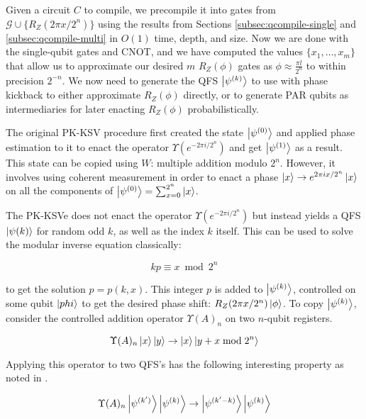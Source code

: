 Given a circuit $C$ to compile, we
precompile it into gates from $\mathcal{G} \cup \{R_Z(2\pi x / 2^n)\}$
using the results from Sections \ref{subsec:qcompile-single} and
\ref{subsec:qcompile-multi} in $O(1)$ time, depth, and size.
Now we are done with the single-qubit gates and CNOT, and we have computed
the values $\{x_1, \ldots , x_m\}$ that allow us to approximate our
desired $m$
$R_Z(\phi)$ gates as $\phi \approx \frac{\pi l}{2^n}$ to within precision
$2^{-n}$. We now need to generate the QFS $\left\vert{\psi^{(k)}}\right\rangle$ to use with
phase kickback to either approximate $R_Z(\phi)$ directly, or to generate
PAR qubits as intermediaries for later enacting $R_Z(\phi)$ probabilistically.

The original PK-KSV procedure first created the state $\left\vert{\psi^{(0)}}\right\rangle$
and applied phase estimation to it to enact the operator $\Upsilon(e^{-2\pi i / 2^n})$
and get $\left\vert{\psi^{(1)}}\right\rangle$ as a result. This state can be copied using
$W$: multiple addition modulo $2^n$. However, it involves using coherent measurement
in order to enact a phase $\left\vert{x}\right\rangle \rightarrow e^{2\pi i x / 2^n}\left\vert{x}\right\rangle$ on
all the components of $\left\vert{\psi^{(0)}}\right\rangle = \sum_{x = 0}^{2^n} \left\vert{x}\right\rangle$.

The PK-KSVe does not enact the operator $\Upsilon(e^{-2\pi i / 2^n})$ but instead
yields a QFS $\left\vert{\psi{(k)}}\right\rangle$ for random odd $k$, as well as the index $k$ itself.
This can be used to solve the modular inverse equation classically:

\begin{equation}
kp \equiv x \bmod 2^n
\end{equation}

to get the solution $p = p(k,x)$.
 This integer 
$p$ is added to $\left\vert{\psi^{(k)}}\right\rangle$, controlled on some qubit $\left\vert{phi}\right\rangle$
to get the desired phase shift: $R_Z(2\pi x / 2^n)\left\vert{\phi}\right\rangle$.
To copy $\left\vert{\psi^{(k)}}\right\rangle$, consider the controlled addition operator $\Upsilon(A)_n$
on two $n$-qubit registers.

\begin{equation}
\Upsilon(A)_n \left\vert{x}\right\rangle\left\vert{y}\right\rangle \rightarrow \left\vert{x}\right\rangle\left\vert{y + x \bmod 2^n}\right\rangle
\end{equation}

Applying this operator to two QFS's has the following interesting property
as noted in \cite{Jones2013}.

\begin{equation}
\Upsilon(A)_n \left\vert{\psi^{(k')}}\right\rangle\left\vert{\psi^{(k)}}\right\rangle \rightarrow \left\vert{\psi^{(k'-k)}}\right\rangle\left\vert{\psi^{(k)}}\right\rangle
\end{equation}

